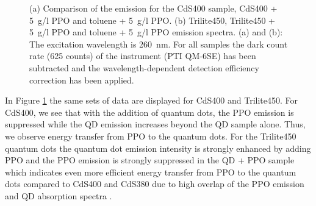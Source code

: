 \documentclass[cits]{JINST}
\begin{document}
\begin{figure}
      \begin{center}
\caption[]{(a) Comparison of the emission for the CdS400 sample, CdS400 + 5~g/l PPO and toluene + 5~g/l PPO. (b) Trilite450, Trilite450 + 5~g/l PPO and toluene + 5~g/l PPO emission spectra. (a) and (b): The excitation wavelength is 260~nm. For all samples the dark count rate (625 counts) of the instrument (PTI QM-6SE) has been subtracted and the wavelength-dependent detection efficiency correction has been applied. \label{G_QD400_QD450_ex260_corr}}
        \end{center}
\end{figure}

In Figure \ref{G_QD400_QD450_ex260_corr} the same sets of data are displayed for CdS400 and Trilite450. For CdS400, we see that with the addition of quantum dots, the PPO emission is suppressed while the QD emission increases beyond the QD sample alone. Thus, we observe energy transfer from PPO to the quantum dots. For the Trilite450 quantum dots the quantum dot emission intensity is strongly enhanced by adding PPO and the PPO emission is strongly suppressed in the QD + PPO sample which indicates even more efficient energy transfer from PPO to the quantum dots compared to CdS400 and CdS380 due to high overlap of the PPO emission and QD absorption spectra \cite{foerster}.  
\end{document}
